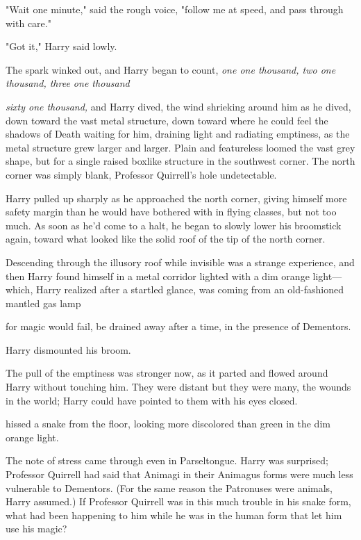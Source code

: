 "Wait one minute," said the rough voice, "follow me at speed, and pass through
with care."

"Got it," Harry said lowly.

The spark winked out, and Harry began to count, \emph{one one thousand, two one
thousand, three one thousand{\el}}

\emph{{\el} sixty one thousand,} and Harry dived, the wind shrieking around
him as he dived, down toward the vast metal structure, down toward where he
could feel the shadows of Death waiting for him, draining light and radiating
emptiness, as the metal structure grew larger and larger. Plain and featureless
loomed the vast grey shape, but for a single raised boxlike structure in the
southwest corner. The north corner was simply blank, Professor Quirrell's hole
undetectable.

Harry pulled up sharply as he approached the north corner, giving himself more
safety margin than he would have bothered with in flying classes, but not too
much. As soon as he'd come to a halt, he began to slowly lower his broomstick
again, toward what looked like the solid roof of the tip of the north corner.

Descending through the illusory roof while invisible was a strange experience,
and then Harry found himself in a metal corridor lighted with a dim orange
light---which, Harry realized after a startled glance, was coming from an
old-fashioned mantled gas lamp{\el}

{\el} for magic would fail, be drained away after a time, in the presence of
Dementors.

Harry dismounted his broom.

The pull of the emptiness was stronger now, as it parted and flowed around
Harry without touching him. They were distant but they were many, the wounds in
the world; Harry could have pointed to them with his eyes closed.

 hissed a snake from the floor, looking more
discolored than green in the dim orange light.

The note of stress came through even in Parseltongue. Harry was surprised;
Professor Quirrell had said that Animagi in their Animagus forms were much less
vulnerable to Dementors. (For the same reason the Patronuses were animals,
Harry assumed.) If Professor Quirrell was in this much trouble in his snake
form, what had been happening to him while he was in the human form that let
him use his magic{\el}?


